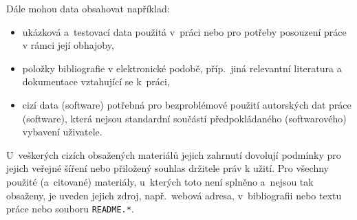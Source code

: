 \documentclass[
  master,
  program=ainf,
  tables=false,
  sourcecodes,
  glossaries,
  index
]{kidiplom}
\begin{document}
Dále mohou data obsahovat například:

\begin{itemize}

  \item
        ukázková a~testovací data použitá v~práci nebo pro potřeby posouzení
        práce v rámci její obhajoby,

  \item
        položky bibliografie v elektronické podobě, příp.~jiná relevantní
        literatura
        a dokumentace vztahující se k~práci,

  \item
        cizí data (software) potřebná pro bezproblémové použití autorských
        dat práce (software), která nejsou standardní součástí
        předpokládaného (softwarového) vybavení uživatele.

\end{itemize}

U~veškerých cizích obsažených materiálů jejich
zahrnutí dovolují podmínky pro jejich veřejné šíření nebo přiložený souhlas
držitele práv k užití. Pro všechny použité (a~citované) materiály,
u~kterých toto není splněno a~nejsou tak obsaženy, je uveden
jejich zdroj, např.~webová adresa, v~bibliografii nebo textu práce
nebo souboru \texttt{README.*}.




\nocite{*}
\end{document}
